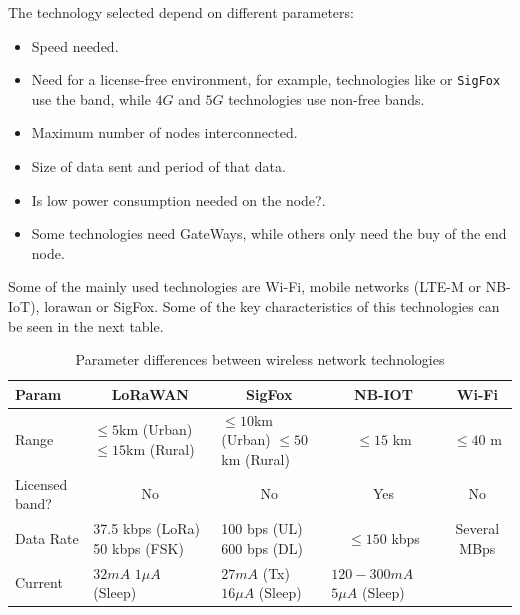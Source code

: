 The technology selected depend on different parameters:
\begin{itemize}
    \item Speed needed.
    \item Need for a license-free environment, for example, technologies like  or \texttt{SigFox} use the  band, while $4G$ and $5G$ technologies use non-free bands.
    \item Maximum number of nodes interconnected.
    \item Size of data sent and period of that data.
    \item Is low power consumption needed on the node?.
    \item Some technologies need GateWays, while others only need the buy of the end node.
\end{itemize}
Some of the mainly used technologies are Wi-Fi, mobile networks (LTE-M or NB-IoT), \acrshort{lorawan} or SigFox. Some of the key characteristics of this technologies can be seen in the next table\cite{IoTSensorNetwork}\cite{surveyLPWAtechnology}\cite{SigfoxEnergyConsumption}.
\begin{table}[H]
    \begin{center}
        \begin{tabular}{p{} |  p{}  p{} p{} p{}}
            \hline
            \textbf{Param} & \multicolumn{1}{c}{\textbf{LoRaWAN}} & \multicolumn{1}{c}{\textbf{SigFox}} & \multicolumn{1}{c}{\textbf{NB-IOT}} & \multicolumn{1}{c}{\textbf{Wi-Fi}}\\
            \hline
            Range & \makecell{$\leq5$km (Urban)\\$\leq15$km (Rural)} & \makecell{$\leq10$km (Urban)\\$\leq50$km (Rural)} & \multicolumn{1}{c}{$\leq15$ km} & \multicolumn{1}{c}{$\leq40$ m}\\
            \hline
            Licensed band? & \multicolumn{1}{c}{No} & \multicolumn{1}{c}{No} & \multicolumn{1}{c}{Yes} & \multicolumn{1}{c}{No}\\
            \hline
            Data Rate & \makecell{37.5 kbps (LoRa) \\ 50 kbps (FSK)} & \makecell{100 bps (UL) \\ 600 bps (DL)} & \multicolumn{1}{c}{$\leq150$ kbps} & \multicolumn{1}{c}{Several MBps}\\
            \hline
            Current & \makecell{$32 mA$ \\ $1 \mu A$ (Sleep)} & \makecell{$27 mA$ (Tx) \\ $16 \mu A$ (Sleep)} & \makecell{$120-300 mA$ \\ $5 \mu A$ (Sleep)} & \\
            \hline
        \end{tabular} 
    \end{center}
    \caption{Parameter differences between wireless network technologies}
    \label{wireless}
\end{table}

